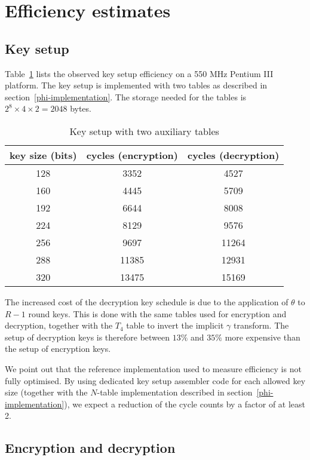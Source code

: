 \documentclass{llncs}
\begin{document}
\section{Efficiency estimates}\label{efficiency}

\subsection{Key setup}

Table~\ref{key-setup} lists the observed key setup efficiency on
a 550 MHz Pentium III platform. The key setup is implemented with
two tables as described in section~\ref{phi-implementation}. The
storage needed for the tables is $2^8 \times 4 \times 2 = 2048$
bytes.
\begin{table}\centering
\caption{Key setup with two auxiliary tables}\label{key-setup}
\begin{tabular}{|c|c|c|} \hline
key size (bits) & cycles (encryption) & cycles (decryption)\\ \hline %
128 &  3352 &  4527 \\ \hline %
160 &  4445 &  5709 \\ \hline %
192 &  6644 &  8008 \\ \hline %
224 &  8129 &  9576 \\ \hline %
256 &  9697 & 11264 \\ \hline %
288 & 11385 & 12931 \\ \hline %
320 & 13475 & 15169 \\ \hline %
\end{tabular}
\end{table}

The increased cost of the decryption key schedule is due to the
application of $\theta$ to $R-1$ round keys. This is done with the
same tables used for encryption and decryption, together with the
$T_4$ table to invert the implicit $\gamma$ transform. The setup of
decryption keys is therefore between $13\%$ and $35\%$
more expensive than the setup of encryption keys.

We point out that the reference implementation used to measure
efficiency is not fully optimised.  By using dedicated key setup
assembler code for each allowed key size (together with the
$N$-table implementation described in
section~\ref{phi-implementation}), we expect a reduction of the
cycle counts by a factor of at least 2.

\subsection{Encryption and decryption}
\end{document}

